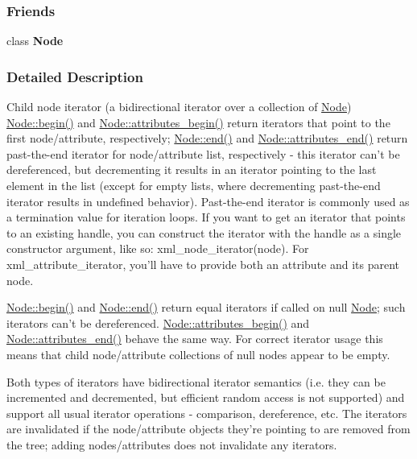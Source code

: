 \subsubsection*{Friends}
\begin{DoxyCompactItemize}
\item 
\hypertarget{classMezzanine_1_1xml_1_1NodeIterator_a6db9d28bd448a131448276ee03de1e6d}{
class {\bfseries Node}}
\label{classMezzanine_1_1xml_1_1NodeIterator_a6db9d28bd448a131448276ee03de1e6d}

\end{DoxyCompactItemize}


\subsubsection{Detailed Description}
Child node iterator (a bidirectional iterator over a collection of \hyperlink{classMezzanine_1_1xml_1_1Node}{Node}) \hyperlink{classMezzanine_1_1xml_1_1Node_aeb8c1969bf9995a5718e9a4911738df5}{Node::begin()} and \hyperlink{classMezzanine_1_1xml_1_1Node_ac2b0aacde495d94e623d6ae6112a4a77}{Node::attributes\_\-begin()} return iterators that point to the first node/attribute, respectively; \hyperlink{classMezzanine_1_1xml_1_1Node_a08959c7e0c3f93be643dc3a29b40060b}{Node::end()} and \hyperlink{classMezzanine_1_1xml_1_1Node_a7a8b4000d8b4a75deb0fd481121b0764}{Node::attributes\_\-end()} return past-\/the-\/end iterator for node/attribute list, respectively -\/ this iterator can't be dereferenced, but decrementing it results in an iterator pointing to the last element in the list (except for empty lists, where decrementing past-\/the-\/end iterator results in undefined behavior). Past-\/the-\/end iterator is commonly used as a termination value for iteration loops. If you want to get an iterator that points to an existing handle, you can construct the iterator with the handle as a single constructor argument, like so: xml\_\-node\_\-iterator(node). For xml\_\-attribute\_\-iterator, you'll have to provide both an attribute and its parent node.\par
\par
 \hyperlink{classMezzanine_1_1xml_1_1Node_aeb8c1969bf9995a5718e9a4911738df5}{Node::begin()} and \hyperlink{classMezzanine_1_1xml_1_1Node_a08959c7e0c3f93be643dc3a29b40060b}{Node::end()} return equal iterators if called on null \hyperlink{classMezzanine_1_1xml_1_1Node}{Node}; such iterators can't be dereferenced. \hyperlink{classMezzanine_1_1xml_1_1Node_ac2b0aacde495d94e623d6ae6112a4a77}{Node::attributes\_\-begin()} and \hyperlink{classMezzanine_1_1xml_1_1Node_a7a8b4000d8b4a75deb0fd481121b0764}{Node::attributes\_\-end()} behave the same way. For correct iterator usage this means that child node/attribute collections of null nodes appear to be empty.\par
\par
 Both types of iterators have bidirectional iterator semantics (i.e. they can be incremented and decremented, but efficient random access is not supported) and support all usual iterator operations -\/ comparison, dereference, etc. The iterators are invalidated if the node/attribute objects they're pointing to are removed from the tree; adding nodes/attributes does not invalidate any iterators. 

